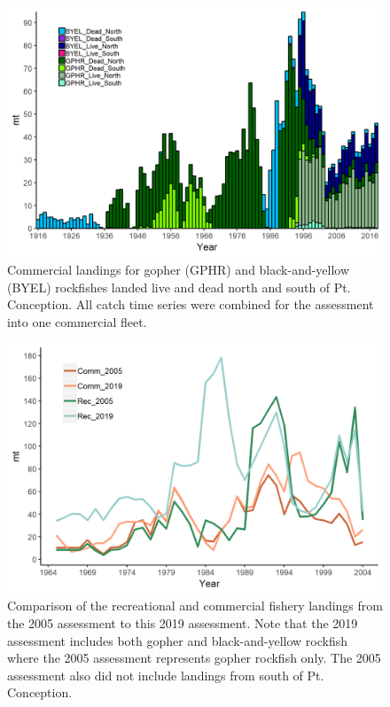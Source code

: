 \documentclass[12pt,]{article}
\begin{document}
\begin{figure}
\centering
\includegraphics{Figures/Catches_livedeadNS_gby.png}
\caption{Commercial landings for gopher (GPHR) and black-and-yellow
(BYEL) rockfishes landed live and dead north and south of Pt.
Conception. All catch time series were combined for the assessment into
one commercial fleet. \label{fig:Catches_livedeadNS_gby}}
\end{figure}

\begin{figure}
\centering
\includegraphics{Figures/assessment_compare.png}
\caption{Comparison of the recreational and commercial fishery landings
from the 2005 assessment to this 2019 assessment. Note that the 2019
assessment includes both gopher and black-and-yellow rockfish where the
2005 assessment represents gopher rockfish only. The 2005 assessment
also did not include landings from south of Pt. Conception.
\label{fig:Assessment_compare}}
\end{figure}
\end{document}
